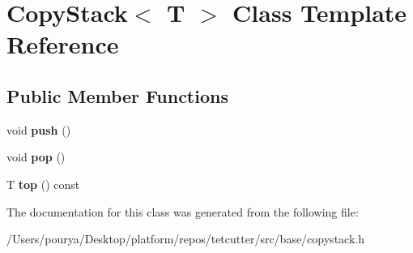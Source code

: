 \hypertarget{classCopyStack}{}\section{Copy\+Stack$<$ T $>$ Class Template Reference}
\label{classCopyStack}
\subsection*{Public Member Functions}
\begin{DoxyCompactItemize}
\item 
\hypertarget{classCopyStack_a79e7cba4f3e706726fa48877e18d60c1}{}void {\bfseries push} ()\label{classCopyStack_a79e7cba4f3e706726fa48877e18d60c1}

\item 
\hypertarget{classCopyStack_a873bbd1fc224927371a9592cd5a6657d}{}void {\bfseries pop} ()\label{classCopyStack_a873bbd1fc224927371a9592cd5a6657d}

\item 
\hypertarget{classCopyStack_a3bc5f8a7708acf8d8c5c9c2f7ca77eb0}{}T {\bfseries top} () const \label{classCopyStack_a3bc5f8a7708acf8d8c5c9c2f7ca77eb0}

\end{DoxyCompactItemize}


The documentation for this class was generated from the following file\+:\begin{DoxyCompactItemize}
\item 
/\+Users/pourya/\+Desktop/platform/repos/tetcutter/src/base/copystack.\+h\end{DoxyCompactItemize}
